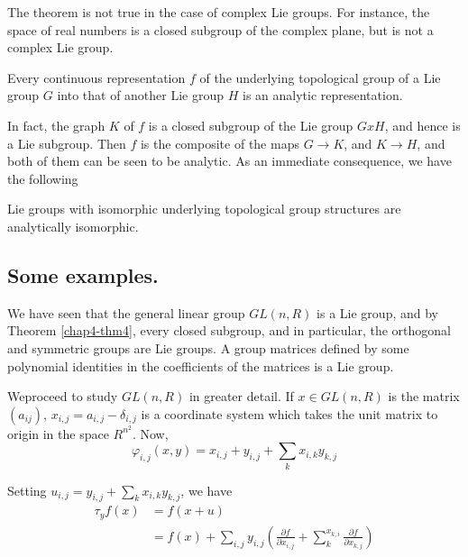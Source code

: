 \begin{remark*}%
 The theorem is not true in the case of complex Lie groups. For
 instance, the space of real numbers is a closed subgroup of the
 complex plane, but is not a complex Lie group. 
\end{remark*}

\begin{corollary}\label{chap4-cor1}%
Every continuous representation  $f$ of the underlying topological
group of a Lie group $G$ into that of another Lie group $H$ is an
analytic representation. 
\end{corollary}

In fact, the graph $K$ of $f$ is a closed subgroup of the Lie group
$G x H$, and hence is a Lie subgroup. Then $f$ is the composite of the
maps $G \rightarrow K$, and $K \rightarrow H$, and both of them can be
seen to be  analytic. As an immediate consequence, we have the
following  

\begin{corollary}\label{chap4-cor2}%
Lie groups with isomorphic underlying topological group structures
are analytically isomorphic. 
\end{corollary}

\subsection{Some examples.}\label{chap4-sec4.6}%

We have seen that the general linear group $GL(n,R)$ is a Lie group,
and by Theorem \ref{chap4-thm4}, every closed subgroup, and in
particular, the orthogonal and symmetric groups are Lie groups. A
group matrices defined by some polynomial identities in the
coefficients of the matrices is a Lie group.  

We\pageoriginale proceed to study $GL(n,R)$ in greater detail. If $x
\in GL(n,R)$ 
is the matrix $(a_{ij})$, $x_{i,j}=a_{i,j} - \delta_{i,j}$ is a coordinate
system which takes the unit matrix to origin in the space $
R^{n^2}$. Now,  
$$
\varphi_{i,j}(x,y) = x_{i,j}+y_{i,j}+ \sum_{k}x_{i,k} y_{k,j}
$$

Setting $u_{i,j}   = y_{i,j} + \sum_{k} x_{i,k}y_{k,j}$,
we have   
\begin{align*}
 \tau_{y}f(x) & =  f(x+u)\\
&   = f(x) + \sum\limits_{i,j} y_{i,j}(\frac{\partial  f}{\partial
   x_{i,j} }+\sum\limits_{k}^{x_{k,i}} \frac{\partial f}{\partial x_{k,j}})
\end{align*}

